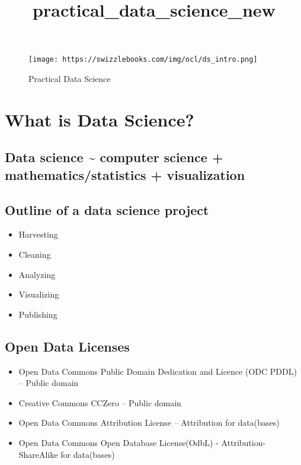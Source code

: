 \documentclass[11pt]{article}
\title{practical\_data\_science\_new}
\makeatletter
\def\maxwidth{\ifdim\Gin@nat@width>\linewidth\linewidth
    \else\Gin@nat@width\fi}
\let\Oldincludegraphics\includegraphics
\renewcommand{\includegraphics}[1]{\Oldincludegraphics[width=.8\maxwidth]{#1}}
\providecommand{\tightlist}{%
      \setlength{\itemsep}{0pt}\setlength{\parskip}{0pt}}
\makeatother
\begin{document}
    
    
    \maketitle
    
    

    
    \begin{figure}[htbp]
\centering
\texttt{[image: https://swizzlebooks.com/img/ocl/ds\_intro.png]}
\caption{Practical Data Science}
\end{figure}

    \section{What is Data Science?}\label{what-is-data-science}

\subsection{Data science \textasciitilde{} computer science +
mathematics/statistics +
visualization}\label{data-science-computer-science-mathematicsstatistics-visualization}

\subsection{Outline of a data science
project}\label{outline-of-a-data-science-project}

\begin{itemize}
\tightlist
\item
  Harvesting
\item
  Cleaning
\item
  Analyzing
\item
  Visualizing
\item
  Publishing
\end{itemize}

\subsection{Open Data Licenses}\label{open-data-licenses}

\begin{itemize}
\tightlist
\item
  Open Data Commons Public Domain Dedication and Licence (ODC PDDL) --
  Public domain
\item
  Creative Commons CCZero -- Public domain
\item
  Open Data Commons Attribution License -- Attribution for data(bases)
\item
  Open Data Commons Open Database License(OdbL) - Attribution-ShareAlike
  for data(bases)
\end{itemize}
\end{document}

